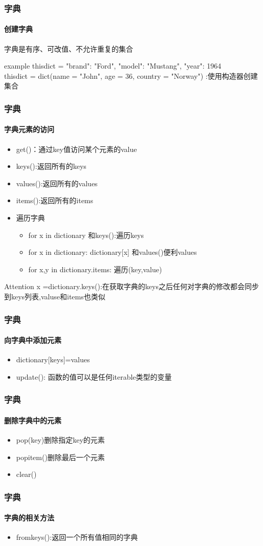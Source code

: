 \documentclass{beamer}
\begin{document}
\begin{frame}[t]
	\frametitle{字典}
	\framesubtitle{创建字典}
	字典是有序、可改值、不允许重复的集合
	\begin{block}{example}
		thisdict = {
		"brand": "Ford",
		"model": "Mustang",
		"year": 1964
		}\\
		thisdict = dict(name = "John", age = 36, country = "Norway") :使用构造器创建集合
	\end{block}

\end{frame}
\begin{frame}[t]
	\frametitle{字典}
	\framesubtitle{字典元素的访问}
	\begin{itemize}
		\item get()：通过key值访问某个元素的value
		\item keys():返回所有的keys
		\item values():返回所有的values
		\item items():返回所有的items
		\item 遍历字典
		      \begin{itemize}
			      \item for x in dictionary 和keys():遍历keys
			      \item for x in dictionary: dictionary[x] 和values()便利values
			      \item for x,y in dictionary.items: 遍历(key,value)
		      \end{itemize}

	\end{itemize}
	\begin{alertblock}{Attention}
		x =dictionary.keys():在获取字典的keys之后任何对字典的修改都会同步到keys列表,valuse和items也类似
	\end{alertblock}

\end{frame}
\begin{frame}[t]
	\frametitle{字典}
	\framesubtitle{向字典中添加元素}
	\begin{itemize}
		\item dictionary[keys]=values
		\item update(): 函数的值可以是任何iterable类型的变量
	\end{itemize}

\end{frame}
\begin{frame}[t]
	\frametitle{字典}
	\framesubtitle{删除字典中的元素}
	\begin{itemize}
		\item pop(key)删除指定key的元素
		\item popitem()删除最后一个元素
		\item clear()
	\end{itemize}
\end{frame}
\begin{frame}[t]
	\frametitle{字典}
	\framesubtitle{字典的相关方法}
	\begin{itemize}
		\item fromkeys():返回一个所有值相同的字典
	\end{itemize}

\end{frame}
\end{document}
